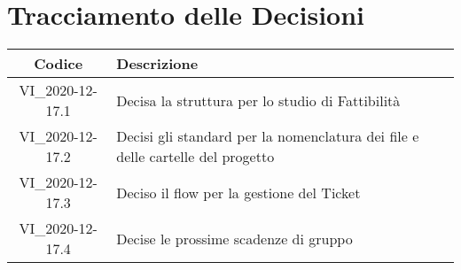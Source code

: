 \section*{Tracciamento delle Decisioni}

\begin{center}
	\begin{longtable}{|c|p{14.5cm}|}
	\hline
	\rowcolor{lighter-grayer}
	\textbf{Codice} & \textbf{Descrizione} \\
	\hline
	\endfirsthead
	\hline
	VI\_2020-12-17.1 & Decisa la struttura per lo studio di Fattibilità \\
	VI\_2020-12-17.2 & Decisi gli standard per la nomenclatura dei file e delle cartelle del progetto \\
	VI\_2020-12-17.3 & Deciso il flow per la gestione del Ticket \\
	VI\_2020-12-17.4 & Decise le prossime scadenze di gruppo \\
	\hline

	\end{longtable}
\end{center}

